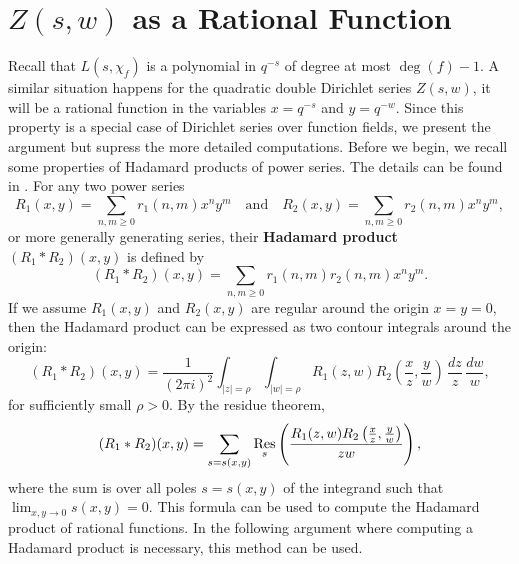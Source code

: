 \documentclass[12pt,reqno,oneside]{amsart}
\begin{document}
\section*{\texorpdfstring{$Z(s,w)$}{Z(s,w)} as a Rational Function}
    Recall that $L(s,\chi_{f})$ is a polynomial in $q^{-s}$ of degree at most $\deg(f)-1$. A similar situation happens for the quadratic double Dirichlet series $Z(s,w)$, it will be a rational function in the variables $x = q^{-s}$ and $y = q^{-w}$. Since this property is a special case of Dirichlet series over function fields, we present the argument but supress the more detailed computations. Before we begin, we recall some properties of Hadamard products of power series. The details can be found in \cite{S}. For any two power series
    \[
        R_{1}(x,y) = \sum_{n,m \ge 0}r_{1}(n,m)x^{n}y^{m} \quad \text{and} \quad R_{2}(x,y) = \sum_{n,m \ge 0}r_{2}(n,m)x^{n}y^{m},
    \]
    or more generally generating series, their \textbf{Hadamard product} $(R_{1} \ast R_{2})(x,y)$ is defined by
    \[
        (R_{1} \ast R_{2})(x,y) = \sum_{n,m \ge 0}r_{1}(n,m)r_{2}(n,m)x^{n}y^{m}.
    \]
    If we assume $R_{1}(x,y)$ and $R_{2}(x,y)$ are regular around the origin $x = y = 0$, then the Hadamard product can be expressed as two contour integrals around the origin:
    \[
        (R_{1} \ast R_{2})(x,y) = \frac{1}{(2\pi i)^{2}}\int_{|z| = \rho}\int_{|w| = \rho}R_{1}(z,w)R_{2}\left(\frac{x}{z},\frac{y}{w}\right)\,\frac{dz}{z}\,\frac{dw}{w},
    \]
    for sufficiently small $\rho > 0$. By the residue theorem,
    \[
        (R_{1} \ast R_{2})(x,y) = \sum_{s = s(x,y)}\operatorname*{\mathrm{Res}}_{s}\left(\frac{R_{1}(z,w)R_{2}\left(\frac{x}{z},\frac{y}{w}\right)}{zw}\right),
    \]
    where the sum is over all poles $s = s(x,y)$ of the integrand such that $\lim_{x,y \to 0}s(x,y) = 0$. This formula can be used to compute the Hadamard product of rational functions. In the following argument where computing a Hadamard product is necessary, this method can be used.
\end{document}
